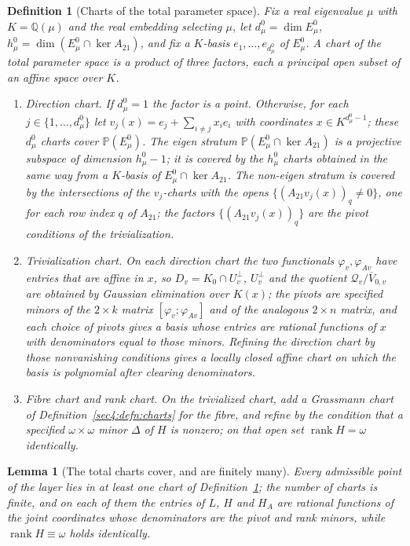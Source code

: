 \documentclass[journal]{IEEEtran}
\theoremstyle{plainn}
\newtheorem{lem}[thm]{Lemma}
\newtheorem{defn}[thm]{Definition}
\theoremstyle{remark}
\newcommand{\rank}{\operatorname{rank}}
\begin{document}
\begin{defn}[Charts of the total parameter space]
\label{sec4:defn:totcharts}
Fix a real eigenvalue $\mu$ with $K=\mathbb Q(\mu)$ and the real embedding selecting $\mu$, let
$d_\mu^0=\dim E_\mu^0$, $h_\mu^0=\dim(E_\mu^0\cap\ker A_{21})$, and fix a $K$-basis
$e_1,\dots,e_{d_\mu^0}$ of $E_\mu^0$. A chart of the total parameter space is a product of three
factors, each a principal open subset of an affine space over $K$.
\begin{enumerate}[label=(\roman*),leftmargin=*]
\item \emph{Direction chart.} If $d_\mu^0=1$ the factor is a point. Otherwise, for each
$j\in\{1,\dots,d_\mu^0\}$ let $v_j(x)=e_j+\sum_{i\ne j}x_i e_i$ with coordinates $x\in K^{d_\mu^0-1}$;
these $d_\mu^0$ charts cover $\mathbb P(E_\mu^0)$. The eigen stratum
$\mathbb P(E_\mu^0\cap\ker A_{21})$ is a projective subspace of dimension $h_\mu^0-1$; it is covered by
the $h_\mu^0$ charts obtained in the same way from a $K$-basis of $E_\mu^0\cap\ker A_{21}$. The non-eigen
stratum is covered by the intersections of the $v_j$-charts with the opens
$\{(A_{21}v_j(x))_q\ne0\}$, one for each row index $q$ of $A_{21}$; the factors
$\{(A_{21}v_j(x))_q\}$ are the pivot conditions of the trivialization.
\item \emph{Trivialization chart.} On each direction chart the two functionals $\varphi_v,\varphi_{Av}$
have entries that are affine in $x$, so $D_v=K_0\cap U_v^\perp$, $U_v^\perp$ and the quotient
$\mathcal Q_v/\overline V_{0,v}$ are obtained by Gaussian elimination over $K(x)$; the pivots are
specified minors of the $2\times k$ matrix $[\varphi_v;\varphi_{Av}]$ and of the analogous
$2\times n$ matrix, and each choice of pivots gives a basis whose entries are rational functions of $x$
with denominators equal to those minors. Refining the direction chart by those nonvanishing conditions
gives a locally closed affine chart on which the basis is polynomial after clearing denominators.
\item \emph{Fibre chart and rank chart.} On the trivialized chart, add a Grassmann chart of
Definition~\ref{sec4:defn:charts} for the fibre, and refine by the condition that a specified
$\omega\times\omega$ minor $\Delta$ of $H$ is nonzero; on that open set $\rank H=\omega$ identically.
\end{enumerate}
\end{defn}

\begin{lem}[The total charts cover, and are finitely many]\label{sec4:lem:cover}
Every admissible point of the layer lies in at least one chart of Definition~\ref{sec4:defn:totcharts};
the number of charts is finite, and on each of them the entries of $L$, $H$ and $H_A$ are rational
functions of the joint coordinates whose denominators are the pivot and rank minors, while
$\rank H\equiv\omega$ holds identically.
\end{lem}
\end{document}
